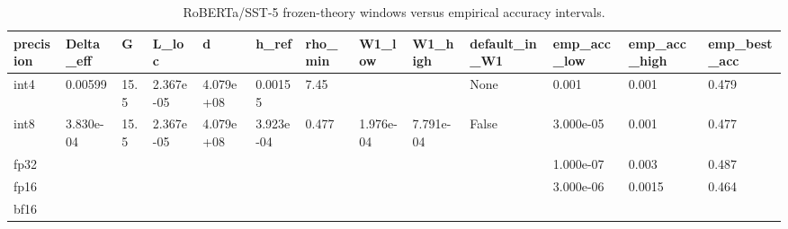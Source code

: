 \begin{table}[t]
\centering
\small
\begin{tabular}{lllllllllllll}
\toprule
precision & Delta\_eff & G & L\_loc & d & h\_ref & rho\_min & W1\_low & W1\_high & default\_in\_W1 & emp\_acc\_low & emp\_acc\_high & emp\_best\_acc \\
\midrule
int4 & 0.00599 & 15.5 & 2.367e-05 & 4.079e+08 & 0.00155 & 7.45 &  &  & None & 0.001 & 0.001 & 0.479 \\
int8 & 3.830e-04 & 15.5 & 2.367e-05 & 4.079e+08 & 3.923e-04 & 0.477 & 1.976e-04 & 7.791e-04 & False & 3.000e-05 & 0.001 & 0.477 \\
fp32 &  &  &  &  &  &  &  &  &  & 1.000e-07 & 0.003 & 0.487 \\
fp16 &  &  &  &  &  &  &  &  &  & 3.000e-06 & 0.0015 & 0.464 \\
bf16 &  &  &  &  &  &  &  &  &  &  &  &  \\
\bottomrule
\end{tabular}
\caption{RoBERTa/SST-5 frozen-theory windows versus empirical accuracy intervals.}
\label{tab:precision_window}
\end{table}

